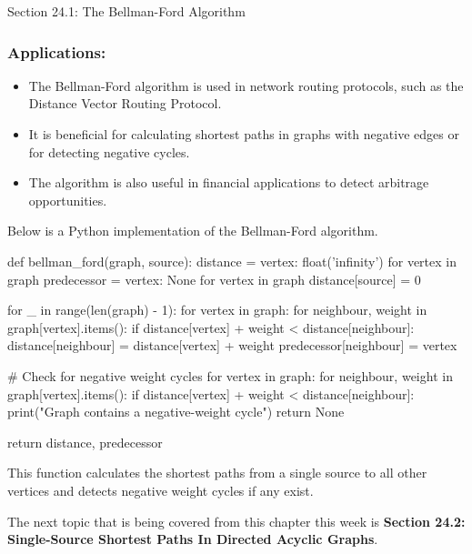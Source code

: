 \begin{notes}{Section 24.1: The Bellman-Ford Algorithm}
    \subsubsection*{Applications:}
    
    \begin{itemize}
        \item The Bellman-Ford algorithm is used in network routing protocols, such as the Distance Vector Routing Protocol.
        \item It is beneficial for calculating shortest paths in graphs with negative edges or for detecting negative cycles.
        \item The algorithm is also useful in financial applications to detect arbitrage opportunities.
    \end{itemize}
    
    \begin{highlight}
    
    Below is a Python implementation of the Bellman-Ford algorithm.
    
    \begin{code}[Python]
    def bellman_ford(graph, source):
        distance = {vertex: float('infinity') for vertex in graph}
        predecessor = {vertex: None for vertex in graph}
        distance[source] = 0
    
        for _ in range(len(graph) - 1):
            for vertex in graph:
                for neighbour, weight in graph[vertex].items():
                    if distance[vertex] + weight < distance[neighbour]:
                        distance[neighbour] = distance[vertex] + weight
                        predecessor[neighbour] = vertex
    
        # Check for negative weight cycles
        for vertex in graph:
            for neighbour, weight in graph[vertex].items():
                if distance[vertex] + weight < distance[neighbour]:
                    print("Graph contains a negative-weight cycle")
                    return None
    
        return distance, predecessor
    \end{code}
    This function calculates the shortest paths from a single source to all other vertices and detects negative weight cycles if any exist.
    \end{highlight}
\end{notes}

The next topic that is being covered from this chapter this week is \textbf{Section 24.2: Single-Source Shortest Paths In Directed Acyclic Graphs}.

